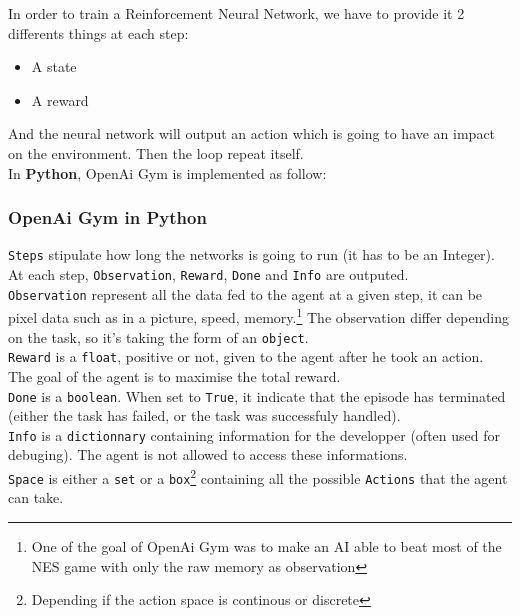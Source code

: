 In order to train a Reinforcement Neural Network, we have to provide it 2 differents things at each step:
\begin{itemize}
\item A state
\item A reward
\end{itemize}
And the neural network will output an action which is going to have an impact on the environment. Then the loop repeat itself.\\

In \textbf{Python}, OpenAi Gym is implemented as follow:

\subsubsection*{OpenAi Gym in Python \cite{OpenAI}}
\texttt{Steps} stipulate how long the networks is going to run (it has to be an Integer). At each step, \texttt{Observation}, \texttt{Reward}, \texttt{Done} and \texttt{Info} are outputed.\\

\texttt{Observation} represent all the data fed to the agent at a given step, it can be pixel data such as in a picture, speed, memory.\footnote{One of the goal of OpenAi Gym was to make an AI able to beat most of the NES game with only the raw memory as observation} The observation differ depending on the task, so it's taking the form of an \texttt{object}.\\

\texttt{Reward} is a \texttt{float}, positive or not, given to the agent after he took an action. The goal of the agent is to maximise the total reward.\\

\texttt{Done} is a \texttt{boolean}. When set to \texttt{True}, it indicate that the episode has terminated (either the task has failed, or the task was successfuly handled).\\

\texttt{Info} is a \texttt{dictionnary} containing information for the developper (often used for debuging). The agent is not allowed to access these informations.\\

\texttt{Space} is either a \texttt{set} or a \texttt{box}\footnote{Depending if the action space is continous or discrete} containing all the possible \texttt{Actions} that the agent can take.\\

